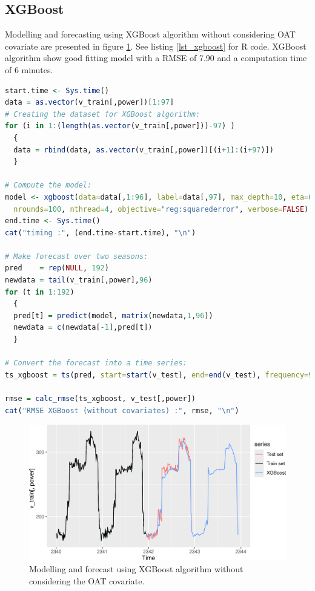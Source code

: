 \subsection{XGBoost}
Modelling and forecasting using XGBoost algorithm without considering OAT covariate are presented 
in figure \ref{figure_xgboost}. See listing \ref{lst_xgboost} for R code. XGBoost algorithm show 
good fitting model with a RMSE of 7.90 and a computation time of 6 minutes.

\begin{lstlisting}[language=R, caption={R code for XGBoost modelling and forecasting}, captionpos=b, label={lst_xgboost}]
start.time <- Sys.time()
data = as.vector(v_train[,power])[1:97]
# Creating the dataset for XGBoost algorithm:
for (i in 1:(length(as.vector(v_train[,power]))-97) )
  {
  data = rbind(data, as.vector(v_train[,power])[(i+1):(i+97)])
  }

# Compute the model:
model <- xgboost(data=data[,1:96], label=data[,97], max_depth=10, eta=0.1, 
  nrounds=100, nthread=4, objective="reg:squarederror", verbose=FALSE)
end.time <- Sys.time()
cat("timing :", (end.time-start.time), "\n") 
 
# Make forecast over two seasons:
pred    = rep(NULL, 192)
newdata = tail(v_train[,power],96)
for (t in 1:192)
  {
  pred[t] = predict(model, matrix(newdata,1,96))
  newdata = c(newdata[-1],pred[t])
  }

# Convert the forecast into a time series:
ts_xgboost = ts(pred, start=start(v_test), end=end(v_test), frequency=96)

rmse = calc_rmse(ts_xgboost, v_test[,power])
cat("RMSE XGBoost (without covariates) :", rmse, "\n")
\end{lstlisting}


\begin{figure}[!h]
\centering
 \includegraphics[scale=0.6]{figures/figure_xgboost.png}
\caption{Modelling and forecast using XGBoost algorithm without considering the OAT covariate.}
\label{figure_xgboost}
\end{figure}


